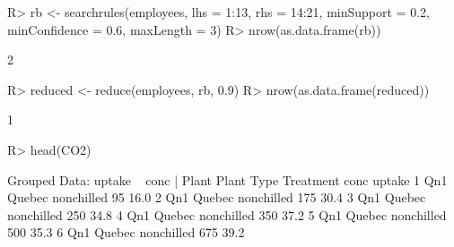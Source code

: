 \documentclass{article}\usepackage[]{graphicx}\usepackage[]{color}
\begin{document}
\begin{Schunk}
% --begin: "reduce"
\begin{Sinput}
R> rb <- searchrules(employees, lhs = 1:13, rhs = 14:21, minSupport = 0.2, minConfidence = 0.6, 
       maxLength = 3)
R> nrow(as.data.frame(rb))
\end{Sinput}
\begin{Soutput}
[1] 2
\end{Soutput}
\begin{Sinput}
R> reduced <- reduce(employees, rb, 0.9)
R> nrow(as.data.frame(reduced))
\end{Sinput}
\begin{Soutput}
[1] 1
\end{Soutput}
%
% --end: "reduce"
\end{Schunk}

\begin{Schunk}
% --begin: "pbld1"
\begin{Sinput}
R> head(CO2)
\end{Sinput}
\begin{Soutput}
Grouped Data: uptake ~ conc | Plant
  Plant   Type  Treatment conc uptake
1   Qn1 Quebec nonchilled   95   16.0
2   Qn1 Quebec nonchilled  175   30.4
3   Qn1 Quebec nonchilled  250   34.8
4   Qn1 Quebec nonchilled  350   37.2
5   Qn1 Quebec nonchilled  500   35.3
6   Qn1 Quebec nonchilled  675   39.2
\end{Soutput}
%
% --end: "pbld1"
\end{Schunk}
\end{document}
